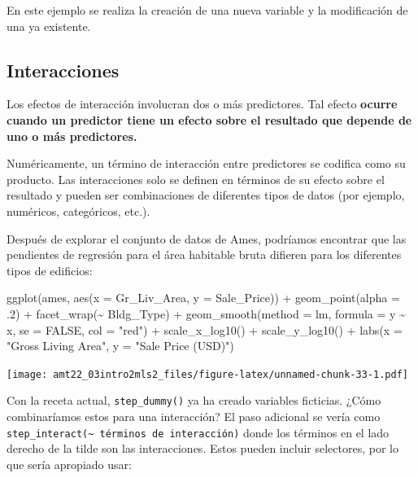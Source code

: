 \documentclass[
]{book}
\newenvironment{Shaded}{\begin{snugshade}}{\end{snugshade}}
\newcommand{\AttributeTok}[1]{\textcolor[rgb]{0.77,0.63,0.00}{#1}}
\newcommand{\ConstantTok}[1]{\textcolor[rgb]{0.00,0.00,0.00}{#1}}
\newcommand{\DecValTok}[1]{\textcolor[rgb]{0.00,0.00,0.81}{#1}}
\newcommand{\FunctionTok}[1]{\textcolor[rgb]{0.00,0.00,0.00}{#1}}
\newcommand{\NormalTok}[1]{#1}
\newcommand{\SpecialCharTok}[1]{\textcolor[rgb]{0.00,0.00,0.00}{#1}}
\newcommand{\StringTok}[1]{\textcolor[rgb]{0.31,0.60,0.02}{#1}}
\begin{document}
En este ejemplo se realiza la creación de una nueva variable y la modificación de una ya existente.

\hypertarget{interacciones}{%
\subsection{Interacciones}\label{interacciones}}

Los efectos de interacción involucran dos o más predictores. Tal efecto \textbf{ocurre cuando un predictor tiene un efecto sobre el resultado que depende de uno o más predictores.}

Numéricamente, un término de interacción entre predictores se codifica como su producto. Las interacciones solo se definen en términos de su efecto sobre el resultado y pueden ser combinaciones de diferentes tipos de datos (por ejemplo, numéricos, categóricos, etc.).

Después de explorar el conjunto de datos de Ames, podríamos encontrar que las pendientes
de regresión para el área habitable bruta difieren para los diferentes tipos de edificios:

\begin{Shaded}
\begin{Highlighting}[]
\FunctionTok{ggplot}\NormalTok{(ames, }\FunctionTok{aes}\NormalTok{(}\AttributeTok{x =}\NormalTok{ Gr\_Liv\_Area, }\AttributeTok{y =}\NormalTok{ Sale\_Price)) }\SpecialCharTok{+} 
  \FunctionTok{geom\_point}\NormalTok{(}\AttributeTok{alpha =}\NormalTok{ .}\DecValTok{2}\NormalTok{) }\SpecialCharTok{+}
  \FunctionTok{facet\_wrap}\NormalTok{(}\SpecialCharTok{\textasciitilde{}}\NormalTok{ Bldg\_Type) }\SpecialCharTok{+} 
  \FunctionTok{geom\_smooth}\NormalTok{(}\AttributeTok{method =}\NormalTok{ lm, }\AttributeTok{formula =}\NormalTok{ y }\SpecialCharTok{\textasciitilde{}}\NormalTok{ x, }\AttributeTok{se =} \ConstantTok{FALSE}\NormalTok{, }\AttributeTok{col =} \StringTok{"red"}\NormalTok{) }\SpecialCharTok{+} 
  \FunctionTok{scale\_x\_log10}\NormalTok{() }\SpecialCharTok{+} 
  \FunctionTok{scale\_y\_log10}\NormalTok{() }\SpecialCharTok{+} 
  \FunctionTok{labs}\NormalTok{(}\AttributeTok{x =} \StringTok{"Gross Living Area"}\NormalTok{, }\AttributeTok{y =} \StringTok{"Sale Price (USD)"}\NormalTok{)}
\end{Highlighting}
\end{Shaded}

\texttt{[image: amt22\_03intro2mls2\_files/figure-latex/unnamed-chunk-33-1.pdf]}

Con la receta actual, \texttt{step\_dummy()} ya ha creado variables ficticias.
¿Cómo combinaríamos estos para una interacción? El paso adicional se vería como
\texttt{step\_interact(\textasciitilde{}\ términos\ de\ interacción)} donde los términos en el lado derecho de la tilde son las interacciones. Estos pueden incluir selectores, por lo que sería apropiado usar:
\end{document}
